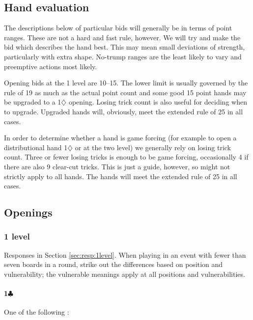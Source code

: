 \documentclass[a4paper,14pt]{extarticle}
\begin{document}
\subsection{Hand evaluation}

The descriptions below of particular bids will generally be in terms of point
ranges. These are not a hard and fast rule, however. We will try and make the
bid which describes the hand best. This may mean small deviations of strength, 
particularly with extra shape. No-trump ranges are the least likely to vary and
preemptive actions most likely.

Opening bids at the 1 level are 10--15. The lower limit is usually governed by
the rule of 19 as much as the actual point count and some good 15 point hands
may be upgraded to a 1$\diamondsuit$ opening. Losing trick count is also 
useful for deciding when to upgrade. Upgraded hands will, obviously, meet the
extended rule of 25 in all cases. 

In order to determine whether a hand is game forcing (for example to open a
distributional hand 1$\diamondsuit$ or at the two level) we generally
rely on losing trick count. Three or fewer losing tricks is enough to be game
forcing, occasionally 4 if there are also 9 clear-cut tricks. This is just a
guide, however, so might not strictly apply to all hands. The hands will meet
the extended rule of 25 in all cases.

\newpage

\subsection{Openings}
\label{sec:openings}

\subsubsection{1 level}
\label{sec:open:1level}

Responses in Section \ref{sec:resp:1level}. When playing in an event with fewer
than seven boards in a round, strike out the differences based on position and
vulnerability; the vulnerable meanings apply at all positions and
vulnerabilities.

\paragraph{1$\clubsuit$}

One of the following :
\end{document}
